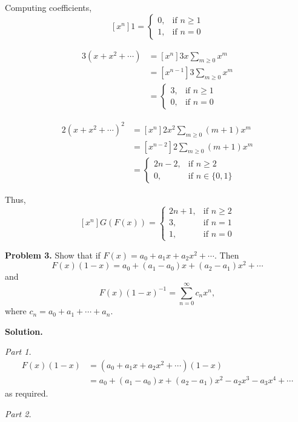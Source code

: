 Computing coefficients,
\[ [x^n]1=
    \begin{cases}
        0, & \text{if } n\geqslant 1 \\
        1, & \text{if } n=0
    \end{cases}
\]

\begin{align*}
    [x^n]3(x+x^2+\cdots)
     & = [x^n] 3x \sum\limits_{m\geqslant 0} x^m   \\
     & = [x^{n-1}]3 \sum\limits_{m\geqslant 0} x^m \\
     & = \begin{cases}
        3, & \text{if } n\geqslant 1 \\
        0, & \text{if } n=0
    \end{cases}
\end{align*}

\begin{align*}
    [x^n]2(x+x^2+\cdots)^2
     & = [x^n]2x^2 \sum\limits_{m\geqslant 0}(m+1)x^m  \\
     & = [x^{n-2}]2\sum\limits_{m\geqslant 0}(m+1)x^m \\
     & = \begin{cases}
        2n-2, & \text{if } n\geqslant 2 \\
        0,    & \text{if } n\in\{0,1\}
    \end{cases}
\end{align*}

Thus,
\[ [x^n]G(F(x))
    =\begin{cases}
        2n+1, & \text{if }  n\ge 2 \\
        3,    & \text{if } n=1     \\
        1,    & \text{if } n=0
    \end{cases}
\]

\textbf{Problem 3.} Show that if $ F(x)=a_0+a_1x+a_2x^2+\cdots $. Then
\[ F(x)(1-x)=a_0+(a_1-a_0)x+(a_2-a_1)x^2+\cdots \]
and
\[ F(x)(1-x)^{-1}=\sum\limits_{n=0}^{\infty} c_n x^n, \]
where $ c_n=a_0+a_1+\cdots+a_n $.

\textbf{Solution.}

\emph{Part 1.}
\begin{align*}
    F(x)(1-x)
     & =(a_0+a_1x+a_2x^2+\cdots)(1-x)                      \\
     & =a_0 + (a_1-a_0)x+(a_2-a_1)x^2-a_2x^3-a_3x^4+\cdots
\end{align*}
as required.

\emph{Part 2.}

